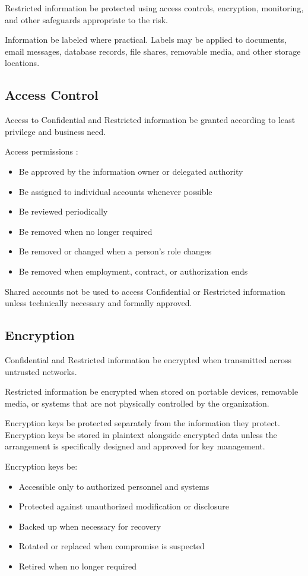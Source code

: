 Restricted information \must{} be protected using access controls, encryption, monitoring, and other safeguards appropriate to the risk.

Information \should{} be labeled where practical. Labels may be applied to documents, email messages, database records, file shares, removable media, and other storage locations.

\subsection{Access Control}

Access to Confidential and Restricted information \must{} be granted according to least privilege and business need.

Access permissions \must{}:
\begin{itemize}
    \item Be approved by the information owner or delegated authority
    \item Be assigned to individual accounts whenever possible
    \item Be reviewed periodically
    \item Be removed when no longer required
    \item Be removed or changed when a person's role changes
    \item Be removed when employment, contract, or authorization ends
\end{itemize}

Shared accounts \should{} not be used to access Confidential or Restricted information unless technically necessary and formally approved.

\subsection{Encryption}

Confidential and Restricted information \must{} be encrypted when transmitted across untrusted networks.

Restricted information \must{} be encrypted when stored on portable devices, removable media, or systems that are not physically controlled by the organization.

Encryption keys \must{} be protected separately from the information they protect. Encryption keys \mustnot{} be stored in plaintext alongside encrypted data unless the arrangement is specifically designed and approved for key management.

Encryption keys \must{} be:
\begin{itemize}
    \item Accessible only to authorized personnel and systems
    \item Protected against unauthorized modification or disclosure
    \item Backed up when necessary for recovery
    \item Rotated or replaced when compromise is suspected
    \item Retired when no longer required
\end{itemize}

